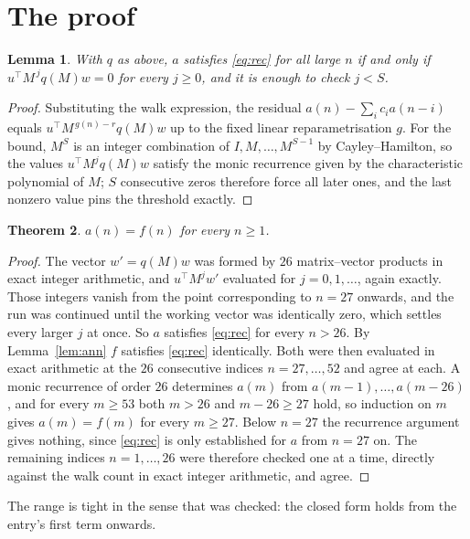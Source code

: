\documentclass[11pt,a4paper]{article}
\theoremstyle{plain}
\newtheorem{theorem}{Theorem}
\newtheorem{lemma}[theorem]{Lemma}
\theoremstyle{definition}
\begin{document}
\section{The proof}

\begin{lemma}\label{lem:crit}
With $q$ as above, $a$ satisfies \eqref{eq:rec} for all large $n$ if and only if
$u^{\!\top}M^{\,j}q(M)w=0$ for every $j\ge0$, and it is enough to check $j<S$.
\end{lemma}

\begin{proof}
Substituting the walk expression, the residual $a(n)-\sum_ic_ia(n-i)$ equals
$u^{\!\top}M^{\,g(n)-r}q(M)w$ up to the fixed linear reparametrisation $g$. For the bound,
$M^{S}$ is an integer combination of $I,M,\dots,M^{S-1}$ by Cayley--Hamilton, so the values
$u^{\!\top}M^{j}q(M)w$ satisfy the monic recurrence given by the characteristic polynomial of
$M$; $S$ consecutive zeros therefore force all later ones, and the last nonzero value pins the
threshold exactly.
\end{proof}

\begin{theorem}
$a(n)=f(n)$ for every $n\ge1$.
\end{theorem}

\begin{proof}
The vector $w'=q(M)w$ was formed by $26$ matrix--vector products in exact integer
arithmetic, and $u^{\!\top}M^{j}w'$ evaluated for $j=0,1,\dots$, again exactly. Those integers
vanish from the point corresponding to $n=27$ onwards, and the run was continued until the
working vector was identically zero, which settles every larger $j$ at once. So $a$ satisfies
\eqref{eq:rec} for every $n>26$. By Lemma~\ref{lem:ann} $f$ satisfies \eqref{eq:rec}
identically. Both were then evaluated in exact arithmetic at the $26$ consecutive indices
$n=27,\dots,52$ and agree at each. A monic recurrence of order $26$
determines $a(m)$ from $a(m-1),\dots,a(m-26)$, and for every $m\ge53$ both
$m>26$ and $m-26\ge27$ hold, so induction on $m$ gives $a(m)=f(m)$ for every
$m\ge27$.
Below $n=27$ the recurrence argument gives nothing, since \eqref{eq:rec} is only
established for $a$ from $n=27$ on. The remaining indices $n=1,\dots,26$ were
therefore checked one at a time, directly against the walk count in exact integer arithmetic,
and agree.
\end{proof}

The range is tight in the sense that was checked: the closed form holds from the entry's first term onwards.
\end{document}
